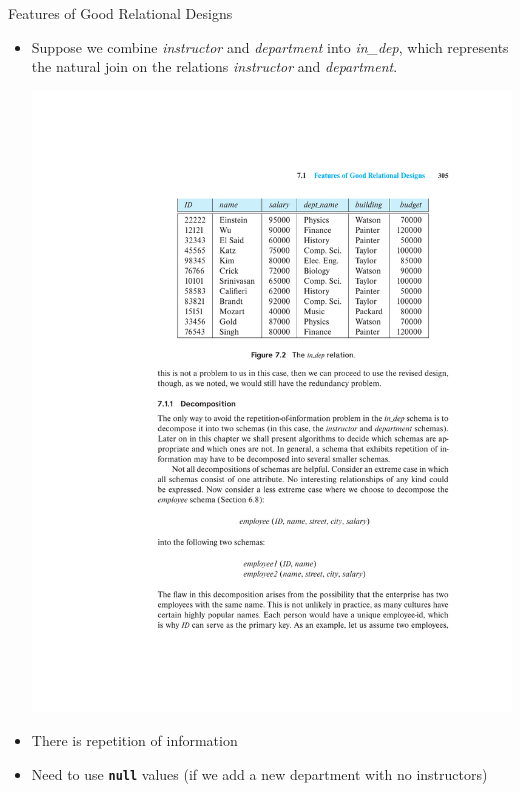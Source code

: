 \documentclass{beamer}
\begin{document}
\begin{frame}{Features of Good Relational Designs}
    \begin{itemize}
        \item Suppose we combine \textit{instructor} and \textit{department} into \textit{in\_dep}, which represents the natural join on the relations \textit{instructor} and \textit{department}.
            \begin{center}
                \includegraphics[width=.7\textwidth, trim={5cm 15.75cm 3.75cm 4.75cm}, clip]{figures/p305_in_dep}
            \end{center}
        \item There is repetition of information
        \item Need to use \texttt{\textbf{null}} values (if we add a new department with no instructors)
    \end{itemize}
\end{frame}
\end{document}
